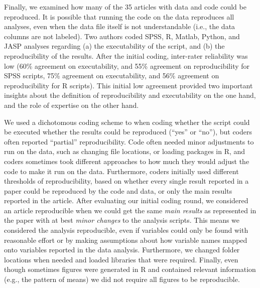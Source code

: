 \documentclass[,jou, a4paper,floatsintext]{apa6}
\begin{document}
Finally, we examined how many of the 35 articles with data and code could be reproduced. It is possible that running the code on the data reproduces all analyses, even when the data file itself is not understandable (i.e., the data columns are not labeled). Two authors coded SPSS, R, Matlab, Python, and JASP analyses regarding (a) the executability of the script, and (b) the reproducibility of the results. After the initial coding, inter-rater reliability was low (60\% agreement on executability, and 55\% agreement on reproducibility for SPSS scripts, 75\% agreement on executability, and 56\% agreement on reproducibility for R scripts). This initial low agreement provided two important insights about the definition of reproducibility and executability on the one hand, and the role of expertise on the other hand.

We used a dichotomous coding scheme to when coding whether the script could be executed whether the results could be reproduced (\enquote{yes} or \enquote{no}), but coders often reported \enquote{partial} reproducibility. Code often needed minor adjustments to run on the data, such as changing file locations, or loading packages in R, and coders sometimes took different approaches to how much they would adjust the code to make it run on the data. Furthermore, coders initially used different thresholds of reproducibility, based on whether every single result reported in a paper could be reproduced by the code and data, or only the main results reported in the article. After evaluating our initial coding round, we considered an article reproducible when we could get the same \emph{main results} as represented in the paper with at best \emph{minor changes} to the analysis scripts. This means we considered the analysis reproducible, even if variables could only be found with reasonable effort or by making assumptions about how variable names mapped onto variables reported in the data analysis. Furthermore, we changed folder locations when needed and loaded libraries that were required. Finally, even though sometimes figures were generated in R and contained relevant information (e.g., the pattern of means) we did not require all figures to be reproducible.
\end{document}
